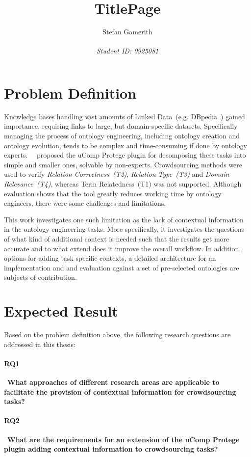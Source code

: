\documentclass[12pt, notitlepage]{article}
\title{TitlePage}
\author{Stefan Gamerith\\\\
		\emph{Student ID: 0925081}}
\begin{document}
	\maketitle
	\thispagestyle{empty}
	\newpage
\setcounter{page}{1}

\section{Problem Definition}
Knowledge bases handling vast amounts of Linked Data~(e.g. DBpedia~\cite{lehmann2015dbpedia}) gained importance, requiring links to large, but domain-specific datasets. Specifically managing the process of ontology engineering, including ontology creation and ontology evolution, tends to be complex and time-consuming if done by ontology experts.
\citeauthor{wohlgenannt2016crowd}~\cite{wohlgenannt2016crowd}~proposed the uComp Protege plugin for decomposing these tasks into simple and smaller ones, solvable by non-experts. Crowdsourcing methods were used to verify \textit{Relation Correctness~(T2)}, \textit{Relation Type~(T3)} and \textit{Domain Relevance~(T4)}, whereas Term Relatedness~(T1) was not supported. Although evaluation shows that the tool greatly reduces working time by ontology engineers, there were some challenges and limitations. 

This work investigates one such limitation as the lack of contextual information in the ontology engineering tasks. More specifically, it investigates the questions of what kind of additional context is needed such that the results get more accurate and to what extend does it improve the overall workflow. In addition, options for adding task specific contexts, a detailed architecture for an implementation and and evaluation against a set of pre-selected ontologies are subjects of contribution. 
\section{Expected Result}
Based on the problem definition above, the following research questions are addressed in this thesis:
\paragraph{RQ1}~\textbf{What approaches of different research areas are applicable to facilitate the provision of contextual information for crowdsourcing tasks?}\\
\paragraph{RQ2}~\textbf{What are the requirements for an extension of the uComp Protege plugin adding contextual information to crowdsourcing tasks?}\\
\end{document}
